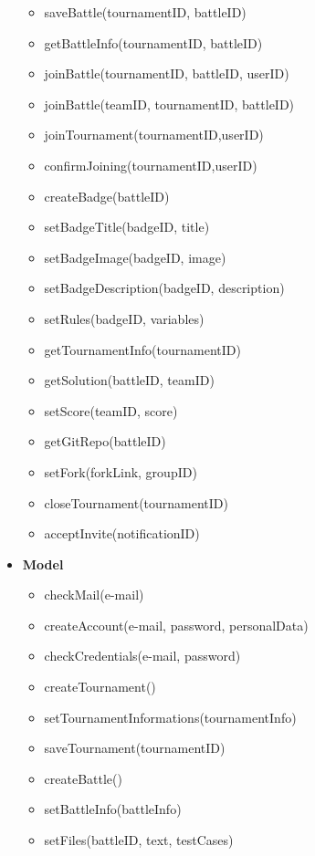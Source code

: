 \documentclass{article}
\begin{document}
\begin{itemize}
\begin{itemize}
            \item saveBattle(tournamentID, battleID)
            \item getBattleInfo(tournamentID, battleID)
            \item joinBattle(tournamentID, battleID, userID)
            \item joinBattle(teamID, tournamentID, battleID)
            \item joinTournament(tournamentID,userID)
            \item confirmJoining(tournamentID,userID)
            \item createBadge(battleID)
            \item setBadgeTitle(badgeID, title)
            \item setBadgeImage(badgeID, image)
            \item setBadgeDescription(badgeID, description)
            \item setRules(badgeID, variables)
            \item getTournamentInfo(tournamentID)
            \item getSolution(battleID, teamID)
            \item setScore(teamID, score)
            \item getGitRepo(battleID)
            \item setFork(forkLink, groupID)
            \item closeTournament(tournamentID)
            \item acceptInvite(notificationID)
        \end{itemize}
    \item \textbf{Model}
        \begin{itemize}
            \item checkMail(e-mail)
            \item createAccount(e-mail, password, personalData)
            \item checkCredentials(e-mail, password)
            \item createTournament()
            \item setTournamentInformations(tournamentInfo)
            \item saveTournament(tournamentID)
            \item createBattle()
            \item setBattleInfo(battleInfo)
            \item setFiles(battleID, text, testCases)

\end{itemize}
\end{itemize}
\end{document}
